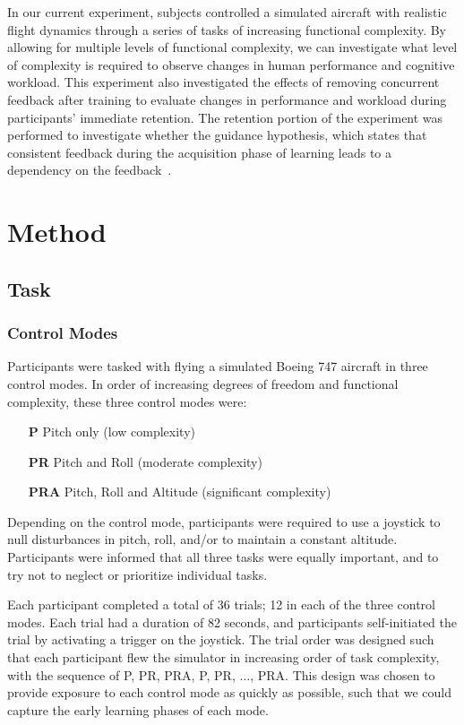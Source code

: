 In our current experiment, subjects controlled a simulated aircraft with realistic flight dynamics through a series of tasks of increasing functional complexity.
By allowing for multiple levels of functional complexity, we can investigate what level of complexity is required to observe changes in human performance and cognitive workload.
This experiment also investigated the effects of removing concurrent feedback after training to evaluate changes in performance and workload during participants' immediate retention.
The retention portion of the experiment was performed to investigate whether the guidance hypothesis, which states that consistent feedback during the acquisition phase of learning leads to a dependency on the feedback~\citep{salmoni_knowledge_1984}.

\section{Method}
\subsection{Task}
\subsubsection{Control Modes}
Participants were tasked with flying a simulated Boeing 747 aircraft in three control modes. In order of increasing degrees of freedom and functional complexity, these three control modes were:
\begin{itemize}
    \item[\textbf{P}] Pitch only (low complexity)
    \item[\textbf{PR}] Pitch and Roll (moderate complexity)
    \item[\textbf{PRA}] Pitch, Roll and Altitude (significant complexity)
\end{itemize}
Depending on the control mode, participants were required to use a joystick to null disturbances in pitch, roll, and/or to maintain a constant altitude.
Participants were informed that all three tasks were equally important, and to try not to neglect or prioritize individual tasks.

Each participant completed a total of 36 trials; 12 in each of the three control modes.
Each trial had a duration of 82 seconds, and participants self-initiated the trial by activating a trigger on the joystick.
The trial order was designed such that each participant flew the simulator in increasing order of task complexity, with the sequence of P, PR, PRA, P, PR, $\ldots$, PRA.
This design was chosen to provide exposure to each control mode as quickly as possible, such that we could capture the early learning phases of each mode.

